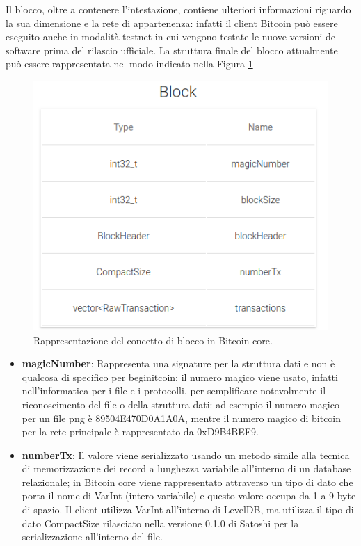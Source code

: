 Il blocco, oltre a contenere l’intestazione, contiene ulteriori informazioni riguardo la sua dimensione e la rete di appartenenza: infatti il client Bitcoin può essere eseguito anche in modalità testnet in cui vengono testate le nuove versioni de software prima del rilascio ufficiale.
La struttura finale del blocco attualmente può essere rappresentata nel modo indicato nella Figura \ref{fig:blockbitcoinc}

\begin{figure}[H]
\begin{center}
\includegraphics[width=0.6\columnwidth]{images/bitcoinstructs/block.png}
\end{center}
\caption{Rappresentazione del concetto di blocco in Bitcoin core.}
\label{fig:blockbitcoinc}
\end{figure}

\begin{itemize}
  \setlength\itemsep{1em}
  \item {\bf magicNumber\/}: Rappresenta una signature per la struttura dati e non è qualcosa di specifico per beginitcoin; il numero magico viene usato, infatti nell’informatica per i file e i protocolli, per semplificare notevolmente il riconoscimento del file o della struttura dati: ad esempio il numero magico per un file png è 89504E470D0A1A0A, mentre il numero magico di bitcoin per la rete principale è rappresentato da 0xD9B4BEF9.
  \item {\bf numberTx\/}: Il valore viene serializzato usando un metodo simile alla tecnica di memorizzazione dei record a lunghezza variabile all’interno di un database relazionale; in Bitcoin core viene rappresentato attraverso un tipo di dato che porta il nome di VarInt (intero variabile) e questo valore occupa da 1 a 9 byte di spazio.
  Il client utilizza VarInt all’interno di LevelDB, ma utilizza il tipo di dato CompactSize rilasciato nella versione 0.1.0 di Satoshi per la serializzazione all’interno del file.
\end{itemize}

